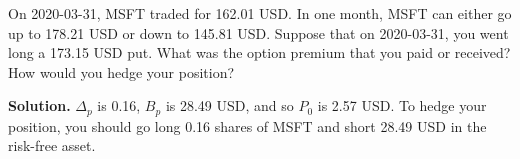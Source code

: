 \noindent On 2020-03-31, MSFT traded for 162.01 USD. In one month, MSFT can either go up to 178.21 USD or down to 145.81 USD. Suppose that on 2020-03-31, you went long a 173.15 USD put. What was the option premium that you paid or received? How would you hedge your position?

\vspace{9pt}

\noindent\textbf{Solution.} $\Delta_{p}$ is 0.16, $B_{p}$ is 28.49 USD, and so $P_{0}$ is 2.57 USD. To hedge your position, you should go long 0.16 shares of MSFT and short 28.49 USD in the risk-free asset.